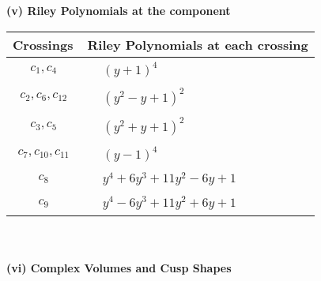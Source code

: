 \documentclass[1p]{elsarticle_modified}
\theoremstyle{definition}
\begin{document}
\newpage\renewcommand{\arraystretch}{1}
\flushleft \textbf{(v) Riley Polynomials at the component}\newline \\
\begin{tabular}{m{50pt}|m{274pt}}
Crossings & \hspace{64pt}Riley Polynomials at each crossing \\
\hline $$\begin{aligned}c_{1},c_{4}\end{aligned}$$&$\begin{aligned}
&(y+1)^4
\end{aligned}$\\
\hline $$\begin{aligned}c_{2},c_{6},c_{12}\end{aligned}$$&$\begin{aligned}
&(y^2- y+1)^2
\end{aligned}$\\
\hline $$\begin{aligned}c_{3},c_{5}\end{aligned}$$&$\begin{aligned}
&(y^2+y+1)^2
\end{aligned}$\\
\hline $$\begin{aligned}c_{7},c_{10},c_{11}\end{aligned}$$&$\begin{aligned}
&(y-1)^4
\end{aligned}$\\
\hline $$\begin{aligned}c_{8}\end{aligned}$$&$\begin{aligned}
&y^4+6 y^3+11 y^2-6 y+1
\end{aligned}$\\
\hline $$\begin{aligned}c_{9}\end{aligned}$$&$\begin{aligned}
&y^4-6 y^3+11 y^2+6 y+1
\end{aligned}$\\
\hline
\end{tabular}\\~\\
\newpage\flushleft \textbf{(vi) Complex Volumes and Cusp Shapes}
\end{document}
